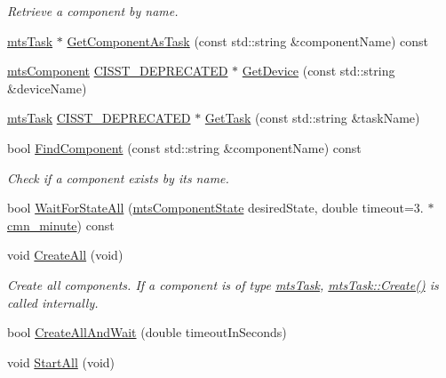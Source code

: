 \begin{DoxyCompactItemize}
\begin{DoxyCompactList}\small\item\em Retrieve a component by name. \end{DoxyCompactList}\item 
\hyperlink{classmts_task}{mts\-Task} $\ast$ \hyperlink{classmts_manager_local_abcc591187a95da4dfddcdc70f340e2c1}{Get\-Component\-As\-Task} (const std\-::string \&component\-Name) const 
\item 
\hyperlink{classmts_component}{mts\-Component} \hyperlink{cmn_portability_8h_a63da7164735f9501be651b1f2bbc0121}{C\-I\-S\-S\-T\-\_\-\-D\-E\-P\-R\-E\-C\-A\-T\-E\-D} $\ast$ \hyperlink{classmts_manager_local_a8bc0276a100b36b06f5088a7f0d04240}{Get\-Device} (const std\-::string \&device\-Name)
\item 
\hyperlink{classmts_task}{mts\-Task} \hyperlink{cmn_portability_8h_a63da7164735f9501be651b1f2bbc0121}{C\-I\-S\-S\-T\-\_\-\-D\-E\-P\-R\-E\-C\-A\-T\-E\-D} $\ast$ \hyperlink{classmts_manager_local_ac128c1f6173b6d4dbe6002106103c5bb}{Get\-Task} (const std\-::string \&task\-Name)
\item 
bool \hyperlink{classmts_manager_local_afc2ea63402479809aa1c72609b8d52b9}{Find\-Component} (const std\-::string \&component\-Name) const 
\begin{DoxyCompactList}\small\item\em Check if a component exists by its name. \end{DoxyCompactList}\item 
bool \hyperlink{classmts_manager_local_a0ae805235f0e479c0c150d7a0999a1e0}{Wait\-For\-State\-All} (\hyperlink{classmts_component_state}{mts\-Component\-State} desired\-State, double timeout=3. $\ast$\hyperlink{cmn_units_8h_a212c64aa2bb4e6ff3d78943569e1b58c}{cmn\-\_\-minute}) const 
\item 
void \hyperlink{classmts_manager_local_a5266feade3df21c28176d03048d8178d}{Create\-All} (void)
\begin{DoxyCompactList}\small\item\em Create all components. If a component is of type \hyperlink{classmts_task}{mts\-Task}, \hyperlink{classmts_task_abc1a625d025c1038fa48137f0ba53465}{mts\-Task\-::\-Create()} is called internally. \end{DoxyCompactList}\item 
bool \hyperlink{classmts_manager_local_a8bfe1cff79e11fa60a2354a3b5ac279b}{Create\-All\-And\-Wait} (double timeout\-In\-Seconds)
\item 
void \hyperlink{classmts_manager_local_a2c7b41b02521fa73490b70c575c3803b}{Start\-All} (void)

\end{DoxyCompactItemize}
